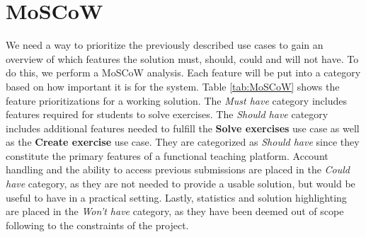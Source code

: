\section{MoSCoW} \label{sec:MoSCoW}
We need a way to prioritize the previously described use cases to gain an overview of which features the solution must, should, could and will not have.
To do this, we perform a MoSCoW analysis.
Each feature will be put into a category based on how important it is for the system.
Table \ref{tab:MoSCoW} shows the feature prioritizations for a working solution.
The \textit{Must have} category includes features required for students to solve exercises.
The \textit{Should have} category includes additional features needed to fulfill the \textbf{Solve exercises} use case as well as the \textbf{Create exercise} use case.
They are categorized as \textit{Should have} since they constitute the primary features of a functional teaching platform.
Account handling and the ability to access previous submissions are placed in the \textit{Could have} category, as they are not needed to provide a usable solution, but would be useful to have in a practical setting.
Lastly, statistics and solution highlighting are placed in the \textit{Won't have} category, as they have been deemed out of scope following to the constraints of the project.


